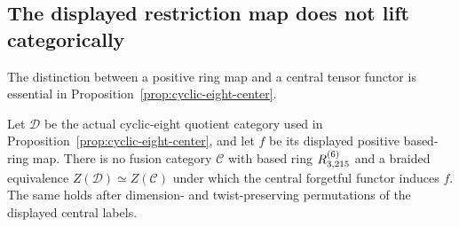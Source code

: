 \subsection{The displayed restriction map does not lift categorically}
\label{sec:cyclic-eight-lift-obstruction}
The distinction between a positive ring map and a central tensor functor
is essential in Proposition~\ref{prop:cyclic-eight-center}.

\begin{proposition}
\label{prop:cyclic-eight-lift-obstruction}
Let $\mathcal D$ be the actual cyclic-eight quotient category used in
Proposition~\ref{prop:cyclic-eight-center}, and let $f$ be its displayed
positive based-ring map. There is no fusion category $\mathcal C$ with
based ring $R^{(6)}_{3,215}$ and a braided equivalence
$Z(\mathcal D)\simeq Z(\mathcal C)$ under which the central forgetful
functor induces $f$. The same holds after dimension- and twist-preserving
permutations of the displayed central labels.
\end{proposition}
